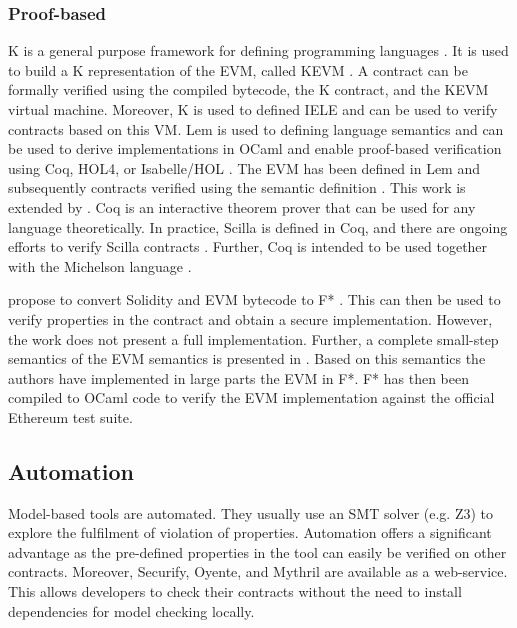 \subsubsection{Proof-based}
K is a general purpose framework for defining programming languages \cite{Rosu2007}. It is used to build a K representation of the EVM, called KEVM \cite{Hildenbrandt2017}. 
A contract can be formally verified using the compiled bytecode, the K contract, and the KEVM virtual machine. Moreover, K is used to defined IELE \cite{Kasampalis2018} and can be used to verify contracts based on this VM.
Lem is used to defining language semantics and can be used to derive implementations in OCaml and enable proof-based verification using Coq, HOL4, or Isabelle/HOL \cite{Mulligan2014}. The EVM has been defined in Lem and subsequently contracts verified using the semantic definition \cite{Hirai2017}. This work is extended by \cite{Amani2018}. 
Coq is an interactive theorem prover that can be used for any language theoretically. In practice, Scilla is defined in Coq, and there are ongoing efforts to verify Scilla contracts \cite{Sergey2018}. Further, Coq is intended to be used together with the Michelson language \cite{DynamicLedgerSolutions2017}.

\citeauthor{Bhargavan2016} propose to convert Solidity and EVM bytecode to F* \cite{Bhargavan2016}. This can then be used to verify properties in the contract and obtain a secure implementation. However, the work does not present a full implementation.
Further, a complete small-step semantics of the EVM semantics is presented in \cite{Grishchenko2018}. Based on this semantics the authors have implemented in large parts the EVM in F*. F* has then been compiled to OCaml code to verify the EVM implementation against the official Ethereum test suite.

\subsection{Automation} 
Model-based tools are automated. They usually use an SMT solver (e.g. Z3) to explore the fulfilment of violation of properties. Automation offers a significant advantage as the pre-defined properties in the tool can easily be verified on other contracts. Moreover, Securify, Oyente, and Mythril are available as a web-service. This allows developers to check their contracts without the need to install dependencies for model checking locally.

